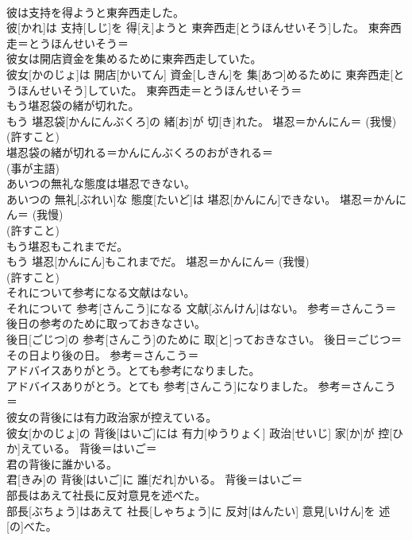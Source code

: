 \documentclass[8pt]{extreport}
\begin{document}
\begin{CJK}{UTF8}{min}
{\\	彼は支持を得ようと東奔西走した。	
\\	彼[かれ]は 支持[しじ]を 得[え]ようと 東奔西走[とうほんせいそう]した。	東奔西走＝とうほんせいそう＝ 
\\	彼女は開店資金を集めるために東奔西走していた。	
\\	彼女[かのじょ]は 開店[かいてん] 資金[しきん]を 集[あつ]めるために 東奔西走[とうほんせいそう]していた。	東奔西走＝とうほんせいそう＝ 
\\	もう堪忍袋の緒が切れた。	
\\	もう 堪忍袋[かんにんぶくろ]の 緒[お]が 切[き]れた。	堪忍＝かんにん＝ (我慢) 
\\	(許すこと) 
\\	堪忍袋の緒が切れる＝かんにんぶくろのおがきれる＝　
\\	(事が主語) 
\\	あいつの無礼な態度は堪忍できない。	
\\	あいつの 無礼[ぶれい]な 態度[たいど]は 堪忍[かんにん]できない。	堪忍＝かんにん＝ (我慢) 
\\	(許すこと) 
\\	もう堪忍もこれまでだ。	
\\	もう 堪忍[かんにん]もこれまでだ。	堪忍＝かんにん＝ (我慢) 
\\	(許すこと) 
\\	それについて参考になる文献はない。	
\\	それについて 参考[さんこう]になる 文献[ぶんけん]はない。	参考＝さんこう＝ 
\\	後日の参考のために取っておきなさい。	
\\	後日[ごじつ]の 参考[さんこう]のために 取[と]っておきなさい。	後日＝ごじつ＝　その日より後の日。 参考＝さんこう＝ 
\\	アドバイスありがとう。とても参考になりました。	
\\	アドバイスありがとう。とても 参考[さんこう]になりました。	参考＝さんこう＝ 
\\	彼女の背後には有力政治家が控えている。	
\\	彼女[かのじょ]の 背後[はいご]には 有力[ゆうりょく] 政治[せいじ] 家[か]が 控[ひか]えている。	背後＝はいご＝ 
\\	君の背後に誰かいる。	
\\	君[きみ]の 背後[はいご]に 誰[だれ]かいる。	背後＝はいご＝ 
\\	部長はあえて社長に反対意見を述べた。	
\\	部長[ぶちょう]はあえて 社長[しゃちょう]に 反対[はんたい] 意見[いけん]を 述[の]べた。	
}
\end{CJK}
\end{document}
